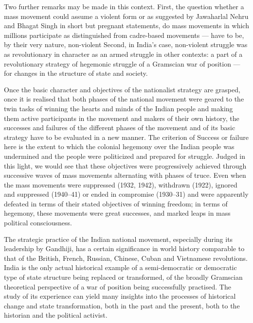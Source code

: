 Two further remarks may be made in this context. First, the question whether a mass movement could assume a violent form or as suggested by Jawaharlal Nehru and Bhagat Singh in short but pregnant statements, do mass movements in which millions participate as distinguished from cadre-based movements --- have to be, by their very nature, non-violent Second, in India's case, non-violent struggle was as revolutionary in character as an armed struggle in other contexts: a part of a revolutionary strategy of hegemonic struggle of a Gramscian war of position --- for changes in the structure of state and society.

Once the basic character and objectives of the nationalist strategy are grasped, once it is realised that both phases of the national movement were geared to the twin tasks of winning the hearts and minds of the Indian people and making them active participants in the movement and makers of their own history, the successes and failures of the different phases of the movement and of its basic strategy have to be evaluated in a new manner. The criterion of Success or failure here is the extent to which the colonial hegemony over the Indian people was undermined and the people were politicized and prepared for struggle. Judged in this light, we would see that these objectives were progressively achieved through successive waves of mass movements alternating with phases of truce. Even when the mass movements were suppressed (1932, 1942), withdrawn (1922), ignored and suppressed (1940--41) or ended in compromise (1930--31) and were apparently defeated in terms of their stated objectives of winning freedom; in terms of hegemony, these movements were great successes, and marked leaps in mass political consciousness.

The strategic practice of the Indian national movement, especially during its leadership by Gandhiji, has a certain significance in world history comparable to that of the British, French, Russian, Chinese, Cuban and Vietnamese revolutions. India is the only actual historical example of a semi-democratic or democratic type of state structure being replaced or transformed, of the broadly Gramscian theoretical perspective of a war of position being successfully practised. The study of its experience can yield many insights into the processes of historical change and state transformation, both in the past and the present, both to the historian and the political activist.

